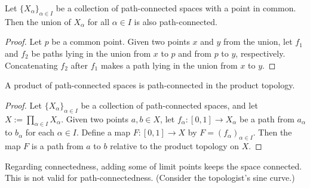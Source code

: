 \begin{prop}
    Let $\{X_\alpha\}_{\alpha\in I}$ be a collection of path-connected spaces with a point in common.
    Then the union of $X_\alpha$ for all $\alpha\in I$ is also path-connected.
\end{prop}
\begin{proof}
    Let $p$ be a common point.
    Given two points $x$ and $y$ from the union, let $f_1$ and $f_2$ be paths lying in the union from $x$ to $p$ and from $p$ to $y$, respectively.
    Concatenating $f_2$ after $f_1$ makes a path lying in the union from $x$ to $y$.
\end{proof}

\begin{thm}
    A product of path-connected spaces is path-connected in the product topology.
\end{thm}
\begin{proof}
    Let $\{X_\alpha\}_{\alpha\in I}$ be a collection of path-connected spaces, and let $X:=\prod_{\alpha\in I} X_\alpha$.
    Given two points $a, b\in X$, let $f_\alpha: [0, 1]\rightarrow X_\alpha$ be a path from $a_\alpha$ to $b_\alpha$ for each $\alpha\in I$.
    Define a map $F: [0, 1]\rightarrow X$ by $F=(f_\alpha)_{\alpha\in I}$.
    Then the map $F$ is a path from $a$ to $b$ relative to the product topology on $X$.
\end{proof}

\begin{rmk}
    Regarding connectedness, adding some of limit points keeps the space connected.
    This is not valid for path-connectedness. (Consider the topologist's sine curve.)
\end{rmk}

